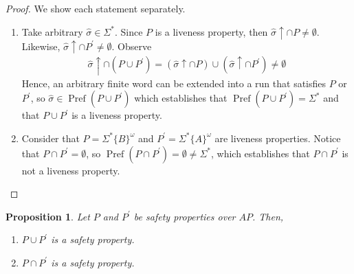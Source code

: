 \documentclass[letterpaper,11pt]{article}
\newtheorem{prop}{Proposition}
\newcommand{\union}{\cup}
\newcommand{\intersn}{\cap}
\newcommand{\up}{\uparrow}
\DeclareMathOperator{\Pref}{Pref}
\begin{document}
\begin{proof}
    We show each statement separately.

    \begin{enumerate}
        \item
            Take arbitrary $\hat \sigma \in \Sigma^*$. Since $P$ is a liveness
            property, then $\hat \sigma \up \intersn P \neq \emptyset$.
            Likewise, $\hat \sigma \up \intersn P^\prime \neq \emptyset$.
            Observe
            \begin{align*}
                \hat \sigma \up \intersn (P \union P^\prime)
                = (\hat \sigma \up \intersn P)
                \union (\hat \sigma \up \intersn P^\prime)
                \neq \emptyset
            \end{align*}
            Hence, an arbitrary finite word can be extended into a run that
            satisfies $P$ or $P^\prime$, so
            $\hat \sigma \in \Pref(P \union P^\prime)$ which establishes that
            $\Pref(P \union P^\prime) = \Sigma^*$ and that $P \union P^\prime$
            is a liveness property.

        \item
            Consider that
            $P = \Sigma^* \{B\}^\omega$ and
            $P^\prime = \Sigma^* \{A\}^\omega$ are liveness properties.
            Notice that $P \intersn P^\prime = \emptyset$,
            so $\Pref(P \intersn P^\prime) = \emptyset \neq \Sigma^*$, which
            establishes that $P \intersn P^\prime$ is not a liveness property.
    \end{enumerate}
\end{proof}

\begin{prop}
    Let $P$ and $P^\prime$ be safety properties over $AP$. Then,
    \begin{enumerate}
        \item $P \union P^\prime$ is a safety property.
        \item $P \intersn P^\prime$ is a safety property.
    \end{enumerate}
\end{prop}
\end{document}
